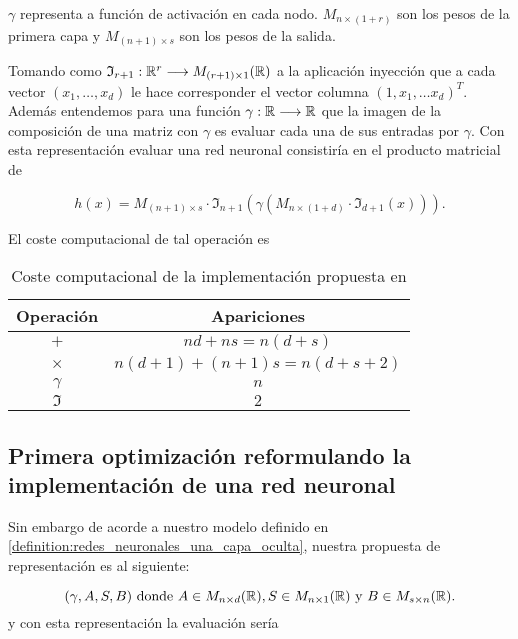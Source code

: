 $\gamma$ representa a función de activación en cada nodo. 
$M_{n \times (1+r)}$ son los pesos de la primera capa 
y $M_{(n+1) \times s}$ son los pesos de la salida. 

Tomando como $\mathfrak{I}_{r+1}: \mathbb{R}^r \longrightarrow M_{(r+1) \times 1}(\mathbb{R})$ a la aplicación inyección que a cada vector $(x_1, \ldots, x_d)$ le hace corresponder el vector columna $(1, x_1, \ldots x_d)^T.$
Además entendemos para una función $\gamma : \mathbb{R} \longrightarrow \mathbb{R}$ 
que la imagen de la composición de una matriz con $\gamma$ es evaluar cada una de sus entradas por $\gamma$. 
Con esta representación evaluar una red neuronal consistiría en el producto matricial de 

\begin{equation}
    h(x) =  M_{(n+1) \times s} \cdot
    \mathfrak{I}_{n+1}\left(
         \gamma \left( 
             M_{n \times (1+d)} 
            \cdot 
            \mathfrak{I}_{d+1}(x)
        \right)
    \right).
\end{equation}

El coste computacional de tal operación es 
\begin{table}[h]
    \begin{center}
    \begin{tabular}{| c | c |}
    \hline
    Operación & Apariciones  \\ \hline
    $+$ & $n d+n s = n(d+s)$  \\
    $\times$ & $n(d+1)+(n+1)s = n(d+s+2)$  \\
    $\gamma$ & $n$  \\
    $\mathfrak{I}$ & $2$  \\
    \hline
    \end{tabular}
    \caption{Coste computacional de la implementación propuesta en \cite{MostafaLearningFromData}}
    \label{tab:coste computacional de la implementación de Mustafa}
    \end{center}
\end{table}

\subsection*{Primera optimización reformulando la implementación de una red neuronal}

Sin embargo de acorde a nuestro modelo definido en \ref{definition:redes_neuronales_una_capa_oculta}, nuestra propuesta de representación es al siguiente: 

\begin{equation}
    (\gamma, A, S, B) 
    \text{ donde } 
    A \in M_{n \times d}(\mathbb{R}), 
    S\in M_{n \times 1}(\mathbb{R}) 
    \text{ y }
    B \in M_{s \times n}(\mathbb{R}).
\end{equation}
y con esta representación la evaluación sería


